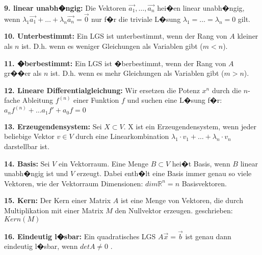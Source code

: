 \textbf{9. linear unabh�ngig:} Die Vektoren $\vec{a_1},\dots,\vec{a_n}$ hei�en linear unabh�ngig, wenn $\lambda_1\vec{a_1} + \dots + \lambda_n\vec{a_n} = \vec{0}$
nur f�r die triviale L�sung $\lambda_1 = \dots = \lambda_n = 0$ gilt.

\textbf{10. Unterbestimmt:} Ein LGS ist unterbestimmt, wenn der Rang von $A$ kleiner als $n$ ist. D.h. wenn es weniger Gleichungen als Variablen gibt ($m < n$).

\textbf{11. �berbestimmt:} Ein LGS ist �berbestimmt, wenn der Rang von $A$ gr��er als $n$ ist. D.h. wenn es mehr Gleichungen als Variablen gibt ($m > n$).

\textbf{12. Lineare Differentialgleichung:} Wir ersetzen die Potenz $x^n$ durch die $n$-fache Ableitung $f^{(n)}$ einer Funktion $f$ und suchen eine L�sung f�r:
$a_nf^{(n)} + \dots a_1f' + a_0f = 0$

\textbf{13. Erzeugendensystem:} Sei $X \subset V$. X ist ein Erzeugendensystem, wenn jeder beliebige Vektor $v \in V$ durch eine Linearkombination $\lambda_1 \cdot v_1 + \dots + \lambda_n \cdot v_n$ darstellbar ist.

\textbf{14. Basis:} Sei $V$ ein Vektorraum. Eine Menge $B \subset V$ hei�t Basis, wenn $B$ linear unabh�ngig ist und $V$ erzeugt. Dabei enth�lt eine Basis immer genau so viele Vektoren, wie der Vektorraum Dimensionen: $dim\mathbb{R}^n = n$ Basisvektoren.

\textbf{15. Kern:} Der Kern einer Matrix $A$ ist eine Menge von Vektoren, die durch Multiplikation mit einer Matrix $M$ den Nullvektor erzeugen. geschrieben: $Kern(M)$

\textbf{16. Eindeutig l�sbar:} Ein quadratisches LGS $A\vec{x} = \vec{b}$ ist genau dann eindeutig l�sbar, wenn $detA \neq 0$ .

